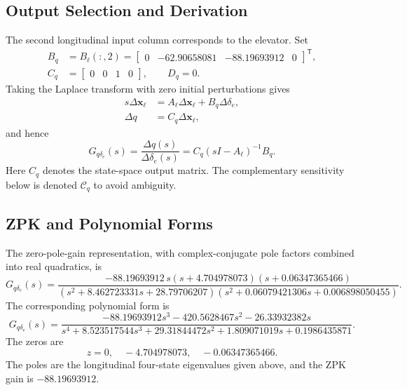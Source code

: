 \documentclass[a4paper,11pt]{article}
\newcommand{\de}{\delta_e}
\newcommand{\Gq}{G_{q\delta_e}}
\begin{document}
\subsection{Output Selection and Derivation}
The second longitudinal input column corresponds to the elevator. Set
\begin{equation}
\begin{aligned}
B_q&=B_\ell(:,2)=\begin{bmatrix}0&-62.90658081&-88.19693912&0\end{bmatrix}^{\mathsf T},\\
C_q&=\begin{bmatrix}0&0&1&0\end{bmatrix},\qquad D_q=0.
\end{aligned}
\end{equation}
Taking the Laplace transform with zero initial perturbations gives
\begin{align}
s\Delta\bm x_\ell&=A_\ell\Delta\bm x_\ell+B_q\Delta\de,\\
\Delta q&=C_q\Delta\bm x_\ell,
\end{align}
and hence
\begin{equation}\label{eq:gdefinition}
\boxed{\Gq(s)=\frac{\Delta q(s)}{\Delta\de(s)}=C_q(sI-A_\ell)^{-1}B_q.}
\end{equation}
Here $C_q$ denotes the state-space output matrix. The complementary sensitivity below is denoted $\mathcal C_q$ to avoid ambiguity.

\subsection{ZPK and Polynomial Forms}
The zero-pole-gain representation, with complex-conjugate pole factors combined into real quadratics, is
\begin{equation}\label{eq:gfactored}
\boxed{\Gq(s)=\frac{-88.19693912\,s(s+4.704978073)(s+0.06347365466)}
{(s^2+8.462723331s+28.79706207)(s^2+0.06079421306s+0.006898050455)}.}
\end{equation}
The corresponding polynomial form is
\begin{equation}
\Gq(s)=\frac{-88.19693912s^3-420.5628467s^2-26.33932382s}
{s^4+8.523517544s^3+29.31844472s^2+1.809071019s+0.1986435871}.
\end{equation}
The zeros are
\begin{equation}
z=0,\quad -4.704978073,\quad -0.06347365466.
\end{equation}
The poles are the longitudinal four-state eigenvalues given above, and the ZPK gain is $-88.19693912$.
\end{document}

